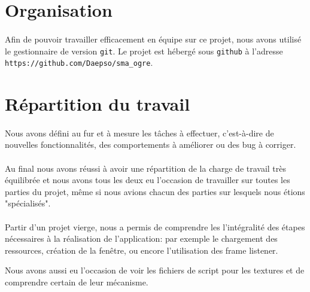 \section{Organisation}
\paragraph{}Afin de pouvoir travailler efficacement en équipe sur ce projet, nous avons 
utilisé le gestionnaire de version \texttt{git}. Le projet est hébergé sous 
\texttt{github} à l'adresse \verb!https://github.com/Daepso/sma_ogre!. 

\section{Répartition du travail}
\paragraph{}Nous avons défini au fur et à mesure les tâches à effectuer, c'est-à-dire de
nouvelles fonctionnalités, des comportements à améliorer ou des bug à
corriger. 

\paragraph{}Au final nous avons réussi à avoir une répartition de la charge de travail
très équilibrée et nous avons tous les deux eu l'occasion de travailler sur
toutes les parties du projet, même si nous avions chacun des parties sur
lesquels nous étions "spécialisés".

\paragraph{}Partir d'un projet vierge, nous a permis de comprendre les
l'intégralité des étapes nécessaires à la réalisation de l'application:
par exemple le chargement des ressources, création de la fenêtre, ou encore l'utilisation 
des frame listener.

Nous avons aussi eu l'occasion de voir les fichiers de script pour les
textures et de comprendre certain de leur mécanisme. 


